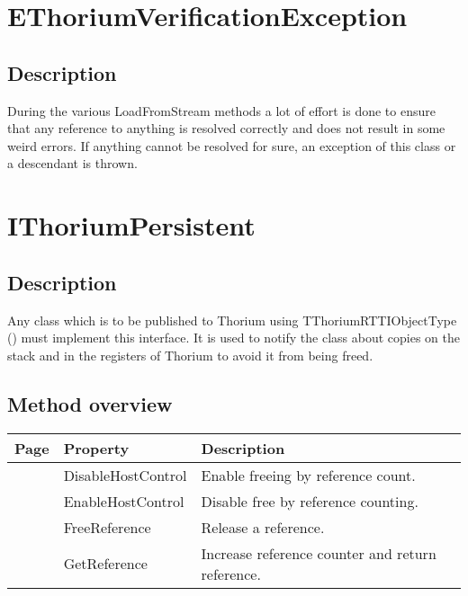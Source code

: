 \section{EThoriumVerificationException}
\label{thoriumcorepkg:thorium:ethoriumverificationexception}
\subsection{Description}
During the various LoadFromStream methods a lot of effort is done to ensure that any reference to anything is resolved correctly and does not result in some weird errors. If anything cannot be resolved for sure, an exception of this class or a descendant is thrown.%
\section{IThoriumPersistent}
\label{thoriumcorepkg:thorium:ithoriumpersistent}
\subsection{Description}
Any class which is to be published to Thorium using TThoriumRTTIObjectType (\pageref{thoriumcorepkg:thorium:tthoriumrttiobjecttype}) must implement this interface. It is used to notify the class about copies on the stack and in the registers of Thorium to avoid it from being freed. %
\subsection{Method overview}
\label{thoriumcorepkg:thorium:ithoriumpersistent:methods}
\begin{tabularx}{\textwidth}{llX}
Page & Property & Description  \\ \hline
\pageref{thoriumcorepkg:thorium:ithoriumpersistent:disablehostcontrol} & DisableHostControl  & Enable freeing by reference count. \\
\pageref{thoriumcorepkg:thorium:ithoriumpersistent:enablehostcontrol} & EnableHostControl  & Disable free by reference counting. \\
\pageref{thoriumcorepkg:thorium:ithoriumpersistent:freereference} & FreeReference  & Release a reference. \\
\pageref{thoriumcorepkg:thorium:ithoriumpersistent:getreference} & GetReference  & Increase reference counter and return reference. \\
\hline
\end{tabularx}

